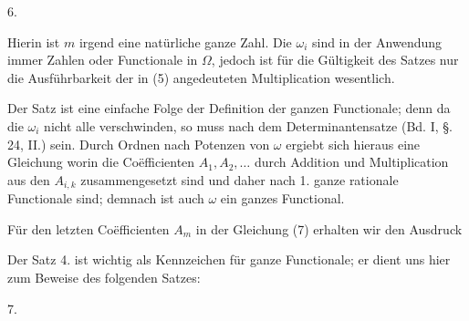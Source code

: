 6. 

Hierin ist $m$ irgend eine natürliche ganze Zahl. Die $\omega_i$ sind in der Anwendung immer Zahlen oder Functionale in $\Omega$, jedoch ist für die Gültigkeit des Satzes nur die Ausführbarkeit der in (5) angedeuteten Multiplication wesentlich.

Der Satz ist eine einfache Folge der Definition der ganzen Functionale; denn da die $\omega_i$ nicht alle verschwinden, so muss nach dem Determinantensatze (Bd. I, §.\,24, II.)
sein. Durch Ordnen nach Potenzen von $\omega$ ergiebt sich hieraus eine Gleichung
worin die Coëfficienten $A_1, A_2, \ldots$ durch Addition und Multiplication aus den $A_{i,k}$ zusammengesetzt sind und daher nach 1. ganze rationale Functionale sind; demnach ist auch $\omega$ ein ganzes Functional.

Für den letzten Coëfficienten $A_m$ in der Gleichung (7) erhalten wir den Ausdruck

Der Satz 4. ist wichtig als Kennzeichen für ganze Functionale; er dient uns hier zum Beweise des folgenden Satzes: %

7. 

